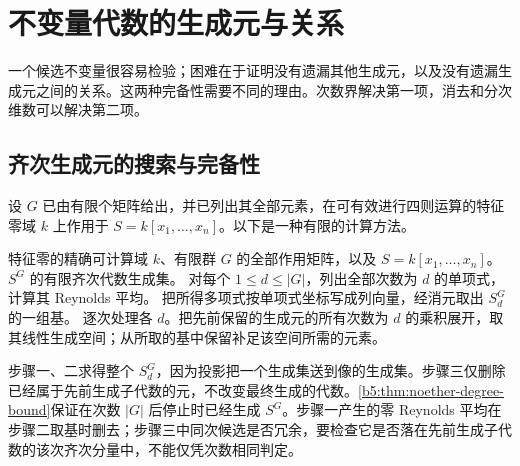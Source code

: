 %
%
\section{不变量代数的生成元与关系}
\label{b5:sec:2204}

一个候选不变量很容易检验；困难在于证明没有遗漏其他生成元，以及没有遗漏生成元之间的关系。这两种完备性需要不同的理由。次数界解决第一项，消去和分次维数可以解决第二项。

\subsection{齐次生成元的搜索与完备性}
\label{b5:subsec:2204:01}

设 \(G\) 已由有限个矩阵给出，并已列出其全部元素，在可有效进行四则运算的特征零域 \(k\) 上作用于 \(S=k[x_1,\ldots,x_n]\)。以下是一种有限的计算方法。
\begin{algorithm}[htbp]
	\caption{Reynolds 平均生成元搜索}
	\label{b5:alg:reynolds-generator-search}
	\begin{algorithmsteps}
		{特征零的精确可计算域 \(k\)、有限群 \(G\) 的全部作用矩阵，以及 \(S=k[x_1,\ldots,x_n]\)。}
		{\(S^G\) 的有限齐次代数生成集。}
		\State 对每个 \(1\le d\le |G|\)，列出全部次数为 \(d\) 的单项式，计算其 Reynolds 平均。
		\State 把所得多项式按单项式坐标写成列向量，经消元取出 \(S_d^G\) 的一组基。
		\State 逐次处理各 \(d\)。把先前保留的生成元的所有次数为 \(d\) 的乘积展开，取其线性生成空间；从所取的基中保留补足该空间所需的元素。
	\end{algorithmsteps}
\end{algorithm}
步骤一、二求得整个 \(S_d^G\)，因为投影把一个生成集送到像的生成集。步骤三仅删除已经属于先前生成子代数的元，不改变最终生成的代数。\cref{b5:thm:noether-degree-bound}保证在次数 \(|G|\) 后停止时已经生成 \(S^G\)。步骤一产生的零 Reynolds 平均在步骤二取基时删去；步骤三中同次候选是否冗余，要检查它是否落在先前生成子代数的该次齐次分量中，不能仅凭次数相同判定。

